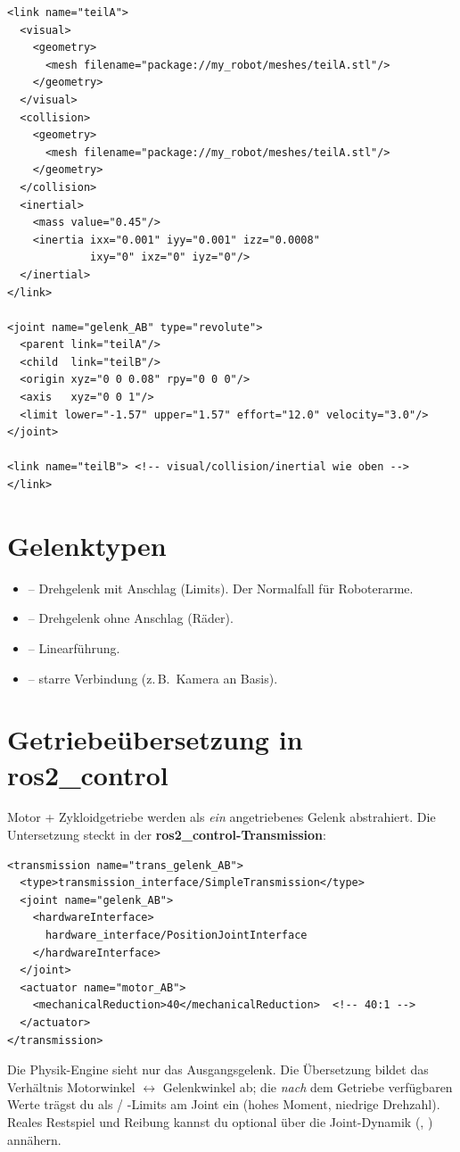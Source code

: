\begin{lstlisting}[style=xml,caption={URDF-Auszug: zwei Links mit Drehgelenk}]
<link name="teilA">
  <visual>
    <geometry>
      <mesh filename="package://my_robot/meshes/teilA.stl"/>
    </geometry>
  </visual>
  <collision>
    <geometry>
      <mesh filename="package://my_robot/meshes/teilA.stl"/>
    </geometry>
  </collision>
  <inertial>
    <mass value="0.45"/>
    <inertia ixx="0.001" iyy="0.001" izz="0.0008"
             ixy="0" ixz="0" iyz="0"/>
  </inertial>
</link>

<joint name="gelenk_AB" type="revolute">
  <parent link="teilA"/>
  <child  link="teilB"/>
  <origin xyz="0 0 0.08" rpy="0 0 0"/>
  <axis   xyz="0 0 1"/>
  <limit lower="-1.57" upper="1.57" effort="12.0" velocity="3.0"/>
</joint>

<link name="teilB"> <!-- visual/collision/inertial wie oben --> </link>
\end{lstlisting}

\section{Gelenktypen}
\begin{itemize}
\item {} -- Drehgelenk mit Anschlag (Limits). Der Normalfall für
  Roboterarme.
\item {} -- Drehgelenk ohne Anschlag (Räder).
\item {} -- Linearführung.
\item {} -- starre Verbindung (z.\,B.\ Kamera an Basis).
\end{itemize}

\section{Getriebeübersetzung in ros2\_control}
Motor + Zykloidgetriebe werden als \emph{ein} angetriebenes Gelenk abstrahiert.
Die Untersetzung steckt in der \textbf{ros2\_control-Transmission}:
\begin{lstlisting}[style=xml,caption={Getriebeübersetzung als SimpleTransmission}]
<transmission name="trans_gelenk_AB">
  <type>transmission_interface/SimpleTransmission</type>
  <joint name="gelenk_AB">
    <hardwareInterface>
      hardware_interface/PositionJointInterface
    </hardwareInterface>
  </joint>
  <actuator name="motor_AB">
    <mechanicalReduction>40</mechanicalReduction>  <!-- 40:1 -->
  </actuator>
</transmission>
\end{lstlisting}
\noindent Die Physik-Engine sieht nur das Ausgangsgelenk. Die Übersetzung
bildet das Verhältnis Motorwinkel $\leftrightarrow$ Gelenkwinkel ab; die
\emph{nach} dem Getriebe verfügbaren Werte trägst du als /
-Limits am Joint ein (hohes Moment, niedrige Drehzahl). Reales
Restspiel und Reibung kannst du optional über die Joint-Dynamik
(, ) annähern.
